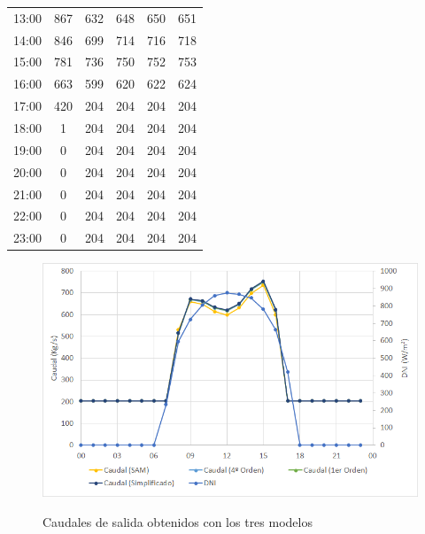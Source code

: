 \begin{table}[h!]
{\begin{tabular}{cccccc}
13:00 & 867 & 632          & 648               & 650                & 651                   \\ 
14:00 & 846 & 699          & 714               & 716                & 718                   \\ 
15:00 & 781 & 736          & 750               & 752                & 753                   \\ 
16:00 & 663 & 599          & 620               & 622                & 624                   \\ 
17:00 & 420 & 204          & 204               & 204                & 204                   \\ 
18:00 & 1   & 204          & 204               & 204                & 204                   \\ 
19:00 & 0   & 204          & 204               & 204                & 204                   \\ 
20:00 & 0   & 204          & 204               & 204                & 204                   \\ 
21:00 & 0   & 204          & 204               & 204                & 204                   \\ 
22:00 & 0   & 204          & 204               & 204                & 204                   \\ 
23:00 & 0   & 204          & 204               & 204                & 204                   
\end{tabular}%
}
\end{table}

\begin{figure}[h!]
\caption{Caudales de salida obtenidos con los tres modelos} 
\includegraphics[width=0.9\linewidth]{images/caudales_modelos.png}
\label{fig:caudales_modelos}
\end{figure}


